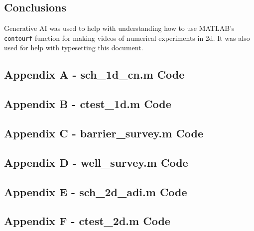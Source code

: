 \documentclass[10pt]{article}
\def\code#1{\texttt{#1}} %
\begin{document}
\subsection*{Conclusions}



Generative AI was used to help with understanding how to use MATLAB's \code{contourf} function for 
making videos of numerical experiments in 2d. It was also used for help with typesetting this document.

\pagebreak


\subsection*{Appendix A - sch\_1d\_cn.m Code}

\pagebreak

\subsection*{Appendix B - ctest\_1d.m Code}

\pagebreak

\subsection*{Appendix C - barrier\_survey.m Code}

\pagebreak

\subsection*{Appendix D - well\_survey.m Code}

\pagebreak

\subsection*{Appendix E - sch\_2d\_adi.m Code}

\pagebreak

\subsection*{Appendix F - ctest\_2d.m Code}

\pagebreak
\end{document}
